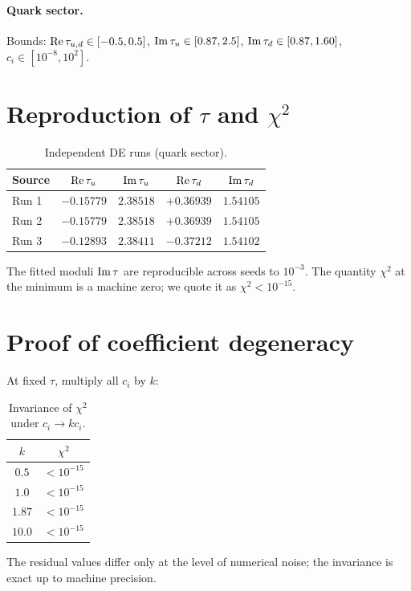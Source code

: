 \documentclass[12pt,a4paper]{article}
\numberwithin{equation}{section}
\begin{document}
\paragraph{Quark sector.} Bounds: \({\rm Re}\,\tau_{u,d}\in[-0.5,0.5]\), \({\rm Im}\,\tau_u\in[0.87,2.5]\), \({\rm Im}\,\tau_d\in[0.87,1.60]\), \(c_i\in[10^{-8},10^2]\).

\section{Reproduction of \(\tau\) and \(\chi^2\)}
\begin{table}[H]
\centering
\caption{Independent DE runs (quark sector).}
\begin{tabular}{lcccc}
\toprule
Source & \({\rm Re}\,\tau_u\) & \({\rm Im}\,\tau_u\) & \({\rm Re}\,\tau_d\) & \({\rm Im}\,\tau_d\) \\
\midrule
Run 1 & \(-0.15779\) & \(2.38518\) & \(+0.36939\) & \(1.54105\) \\
Run 2 & \(-0.15779\) & \(2.38518\) & \(+0.36939\) & \(1.54105\) \\
Run 3 & \(-0.12893\) & \(2.38411\) & \(-0.37212\) & \(1.54102\) \\
\bottomrule
\end{tabular}
\end{table}
The fitted moduli \({\rm Im}\,\tau\) are reproducible across seeds to \(10^{-3}\). The quantity \(\chi^2\) at the minimum is a machine zero; we quote it as \(\chi^2<10^{-15}\).

\section{Proof of coefficient degeneracy}
At fixed \(\tau\), multiply all \(c_i\) by \(k\):
\begin{table}[H]
\centering
\caption{Invariance of \(\chi^2\) under \(c_i\to kc_i\).}
\begin{tabular}{cc}
\toprule
\(k\) & \(\chi^2\) \\
\midrule
\(0.5\)  & \(< 10^{-15}\) \\
\(1.0\)  & \(< 10^{-15}\) \\
\(1.87\) & \(< 10^{-15}\) \\
\(10.0\) & \(< 10^{-15}\) \\
\bottomrule
\end{tabular}
\end{table}
The residual values differ only at the level of numerical noise; the invariance is exact up to machine precision.
\end{document}
